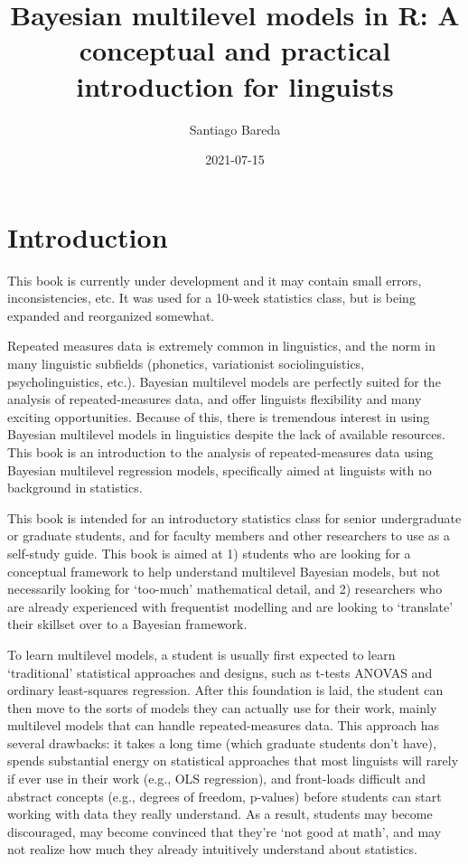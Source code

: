 \documentclass[
]{book}
\title{Bayesian multilevel models in R: A conceptual and practical introduction for linguists}
\author{Santiago Bareda}
\date{2021-07-15}
\begin{document}
\maketitle

{
\setcounter{tocdepth}{1}
\tableofcontents
}
\hypertarget{introduction}{%
\chapter*{Introduction}\label{introduction}}

This book is currently under development and it may contain small errors, inconsistencies, etc. It was used for a 10-week statistics class, but is being expanded and reorganized somewhat.

Repeated measures data is extremely common in linguistics, and the norm in many linguistic subfields (phonetics, variationist sociolinguistics, psycholinguistics, etc.). Bayesian multilevel models are perfectly suited for the analysis of repeated-measures data, and offer linguists flexibility and many exciting opportunities. Because of this, there is tremendous interest in using Bayesian multilevel models in linguistics despite the lack of available resources. This book is an introduction to the analysis of repeated-measures data using Bayesian multilevel regression models, specifically aimed at linguists with no background in statistics.

This book is intended for an introductory statistics class for senior undergraduate or graduate students, and for faculty members and other researchers to use as a self-study guide. This book is aimed at 1) students who are looking for a conceptual framework to help understand multilevel Bayesian models, but not necessarily looking for `too-much' mathematical detail, and 2) researchers who are already experienced with frequentist modelling and are looking to `translate' their skillset over to a Bayesian framework.

To learn multilevel models, a student is usually first expected to learn `traditional' statistical approaches and designs, such as t-tests ANOVAS and ordinary least-squares regression. After this foundation is laid, the student can then move to the sorts of models they can actually use for their work, mainly multilevel models that can handle repeated-measures data. This approach has several drawbacks: it takes a long time (which graduate students don't have), spends substantial energy on statistical approaches that most linguists will rarely if ever use in their work (e.g., OLS regression), and front-loads difficult and abstract concepts (e.g., degrees of freedom, p-values) before students can start working with data they really understand. As a result, students may become discouraged, may become convinced that they're `not good at math', and may not realize how much they already intuitively understand about statistics.
\end{document}
